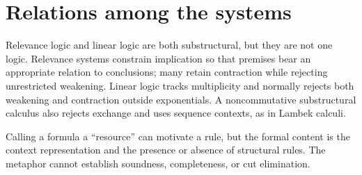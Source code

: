 \section{Relations among the systems}
\label{sec:relevance-linear-04}

Relevance logic and linear logic are both substructural, but they are not one
logic.  Relevance systems constrain implication so that premises bear an
appropriate relation to conclusions; many retain contraction while rejecting
unrestricted weakening.  Linear logic tracks multiplicity and normally rejects
both weakening and contraction outside exponentials.  A noncommutative
substructural calculus also rejects exchange and uses sequence contexts, as in
Lambek calculi.

\begin{warning}
Calling a formula a ``resource'' can motivate a rule, but the formal content is
the context representation and the presence or absence of structural rules.
The metaphor cannot establish soundness, completeness, or cut elimination.
\end{warning}

